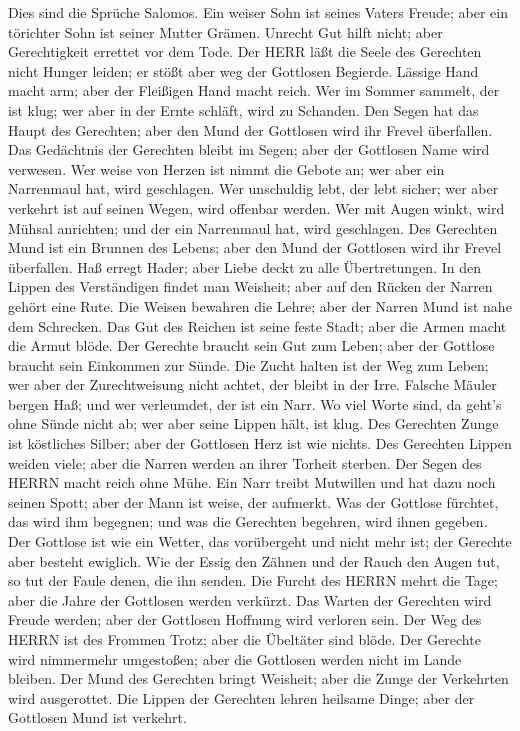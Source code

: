  Dies sind die Sprüche Salomos. Ein weiser Sohn ist seines
Vaters Freude; aber ein törichter Sohn ist seiner Mutter Grämen.
 Unrecht Gut hilft nicht; aber Gerechtigkeit errettet vor
dem Tode.  Der HERR läßt die Seele des Gerechten nicht
Hunger leiden; er stößt aber weg der Gottlosen Begierde. 
Lässige Hand macht arm; aber der Fleißigen Hand macht reich.
 Wer im Sommer sammelt, der ist klug; wer aber in der Ernte
schläft, wird zu Schanden.  Den Segen hat das Haupt des
Gerechten; aber den Mund der Gottlosen wird ihr Frevel überfallen.
 Das Gedächtnis der Gerechten bleibt im Segen; aber der
Gottlosen Name wird verwesen.  Wer weise von Herzen ist
nimmt die Gebote an; wer aber ein Narrenmaul hat, wird geschlagen.
 Wer unschuldig lebt, der lebt sicher; wer aber verkehrt ist
auf seinen Wegen, wird offenbar werden.  Wer mit Augen
winkt, wird Mühsal anrichten; und der ein Narrenmaul hat, wird
geschlagen.  Des Gerechten Mund ist ein Brunnen des Lebens;
aber den Mund der Gottlosen wird ihr Frevel überfallen. 
Haß erregt Hader; aber Liebe deckt zu alle Übertretungen. 
In den Lippen des Verständigen findet man Weisheit; aber auf den Rücken
der Narren gehört eine Rute.  Die Weisen bewahren die
Lehre; aber der Narren Mund ist nahe dem Schrecken.  Das
Gut des Reichen ist seine feste Stadt; aber die Armen macht die Armut
blöde.  Der Gerechte braucht sein Gut zum Leben; aber der
Gottlose braucht sein Einkommen zur Sünde.  Die Zucht
halten ist der Weg zum Leben; wer aber der Zurechtweisung nicht achtet,
der bleibt in der Irre.  Falsche Mäuler bergen Haß; und wer
verleumdet, der ist ein Narr.  Wo viel Worte sind, da
geht's ohne Sünde nicht ab; wer aber seine Lippen hält, ist klug.
 Des Gerechten Zunge ist köstliches Silber; aber der
Gottlosen Herz ist wie nichts.  Des Gerechten Lippen weiden
viele; aber die Narren werden an ihrer Torheit sterben. 
Der Segen des HERRN macht reich ohne Mühe.  Ein Narr treibt
Mutwillen und hat dazu noch seinen Spott; aber der Mann ist weise, der
aufmerkt.  Was der Gottlose fürchtet, das wird ihm
begegnen; und was die Gerechten begehren, wird ihnen gegeben.
 Der Gottlose ist wie ein Wetter, das vorübergeht und nicht
mehr ist; der Gerechte aber besteht ewiglich.  Wie der
Essig den Zähnen und der Rauch den Augen tut, so tut der Faule denen,
die ihn senden.  Die Furcht des HERRN mehrt die Tage; aber
die Jahre der Gottlosen werden verkürzt.  Das Warten der
Gerechten wird Freude werden; aber der Gottlosen Hoffnung wird verloren
sein.  Der Weg des HERRN ist des Frommen Trotz; aber die
Übeltäter sind blöde.  Der Gerechte wird nimmermehr
umgestoßen; aber die Gottlosen werden nicht im Lande bleiben.
 Der Mund des Gerechten bringt Weisheit; aber die Zunge der
Verkehrten wird ausgerottet.  Die Lippen der Gerechten
lehren heilsame Dinge; aber der Gottlosen Mund ist verkehrt.

